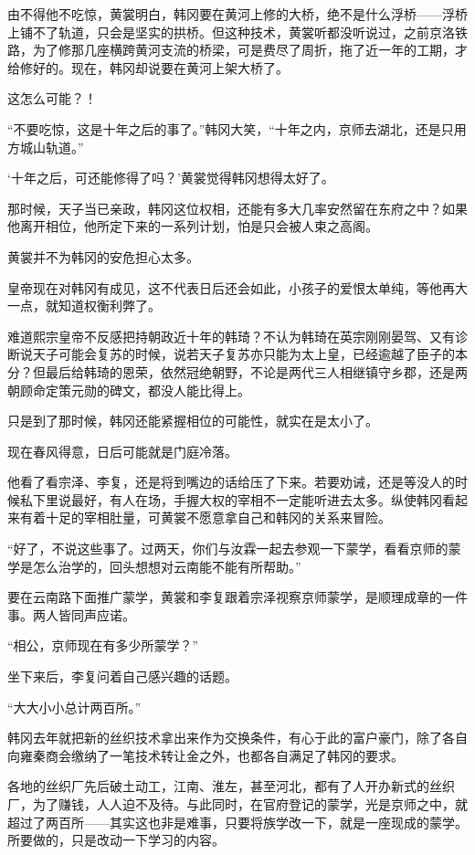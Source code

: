 由不得他不吃惊，黄裳明白，韩冈要在黄河上修的大桥，绝不是什么浮桥——浮桥上铺不了轨道，只会是坚实的拱桥。但这种技术，黄裳听都没听说过，之前京洛铁路，为了修那几座横跨黄河支流的桥梁，可是费尽了周折，拖了近一年的工期，才给修好的。现在，韩冈却说要在黄河上架大桥了。

这怎么可能？！

“不要吃惊，这是十年之后的事了。”韩冈大笑，“十年之内，京师去湖北，还是只用方城山轨道。”

‘十年之后，可还能修得了吗？’黄裳觉得韩冈想得太好了。

那时候，天子当已亲政，韩冈这位权相，还能有多大几率安然留在东府之中？如果他离开相位，他所定下来的一系列计划，怕是只会被人束之高阁。

黄裳并不为韩冈的安危担心太多。

皇帝现在对韩冈有成见，这不代表日后还会如此，小孩子的爱恨太单纯，等他再大一点，就知道权衡利弊了。

难道熙宗皇帝不反感把持朝政近十年的韩琦？不认为韩琦在英宗刚刚晏驾、又有诊断说天子可能会复苏的时候，说若天子复苏亦只能为太上皇，已经逾越了臣子的本分？但最后给韩琦的恩荣，依然冠绝朝野，不论是两代三人相继镇守乡郡，还是两朝顾命定策元勋的碑文，都没人能比得上。

只是到了那时候，韩冈还能紧握相位的可能性，就实在是太小了。

现在春风得意，日后可能就是门庭冷落。

他看了看宗泽、李复，还是将到嘴边的话给压了下来。若要劝诫，还是等没人的时候私下里说最好，有人在场，手握大权的宰相不一定能听进去太多。纵使韩冈看起来有着十足的宰相肚量，可黄裳不愿意拿自己和韩冈的关系来冒险。

“好了，不说这些事了。过两天，你们与汝霖一起去参观一下蒙学，看看京师的蒙学是怎么治学的，回头想想对云南能不能有所帮助。”

要在云南路下面推广蒙学，黄裳和李复跟着宗泽视察京师蒙学，是顺理成章的一件事。两人皆同声应诺。

“相公，京师现在有多少所蒙学？”

坐下来后，李复问着自己感兴趣的话题。

“大大小小总计两百所。”

韩冈去年就把新的丝织技术拿出来作为交换条件，有心于此的富户豪门，除了各自向雍秦商会缴纳了一笔技术转让金之外，也都各自满足了韩冈的要求。

各地的丝织厂先后破土动工，江南、淮左，甚至河北，都有了人开办新式的丝织厂，为了赚钱，人人迫不及待。与此同时，在官府登记的蒙学，光是京师之中，就超过了两百所——其实这也非是难事，只要将族学改一下，就是一座现成的蒙学。所要做的，只是改动一下学习的内容。


